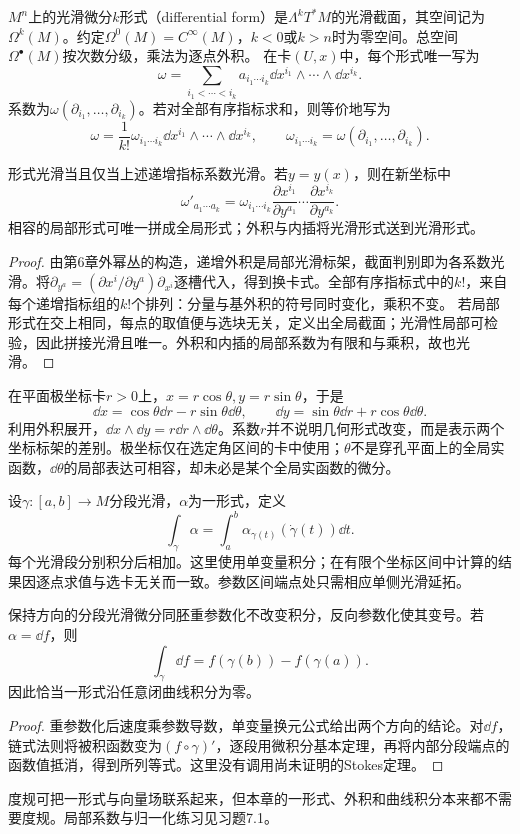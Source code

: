 \begin{definition}[微分形式与局部分量]
$M^n$上的光滑微分$k$形式（differential form）是$\Lambda^kT^*M$的光滑截面，其空间记为$\Omega^k(M)$。约定$\Omega^0(M)=C^\infty(M)$，$k<0$或$k>n$时为零空间。总空间$\Omega^\bullet(M)$按次数分级，乘法为逐点外积。
在卡$(U,x)$中，每个形式唯一写为
\[
 \omega=\sum_{i_1<\cdots<i_k}a_{i_1\cdots i_k}
 \dd x^{i_1}\wedge\cdots\wedge\dd x^{i_k}.
\]
系数为$\omega(\partial_{i_1},\ldots,\partial_{i_k})$。若对全部有序指标求和，则等价地写为
\[
 \omega=\frac1{k!}\omega_{i_1\cdots i_k}
 \dd x^{i_1}\wedge\cdots\wedge\dd x^{i_k},
 \qquad \omega_{i_1\cdots i_k}=\omega(\partial_{i_1},\ldots,\partial_{i_k}).
\]
\end{definition}
\begin{proposition}[形式的局部判别与换卡]\label{prop:forms-local}
形式光滑当且仅当上述递增指标系数光滑。若$y=y(x)$，则在新坐标中
\[
 \omega'_{a_1\cdots a_k}
 =\omega_{i_1\cdots i_k}
 \frac{\partial x^{i_1}}{\partial y^{a_1}}\cdots
 \frac{\partial x^{i_k}}{\partial y^{a_k}}.
\]
相容的局部形式可唯一拼成全局形式；外积与内插将光滑形式送到光滑形式。
\end{proposition}
\begin{proof}
由第6章外幂丛的构造，递增外积是局部光滑标架，截面判别即为各系数光滑。将$\partial_{y^a}=(\partial x^i/\partial y^a)\partial_{x^i}$逐槽代入，得到换卡式。全部有序指标式中的$k!$，来自每个递增指标组的$k!$个排列：分量与基外积的符号同时变化，乘积不变。
若局部形式在交上相同，每点的取值便与选块无关，定义出全局截面；光滑性局部可检验，因此拼接光滑且唯一。外积和内插的局部系数为有限和与乘积，故也光滑。
\end{proof}
\begin{example}[同一个面积形式的不同坐标]
在平面极坐标卡$r>0$上，$x=r\cos\theta,y=r\sin\theta$，于是
\[
 \dd x=\cos\theta\dd r-r\sin\theta\dd\theta,\qquad
 \dd y=\sin\theta\dd r+r\cos\theta\dd\theta.
\]
利用外积展开，$\dd x\wedge\dd y=r\dd r\wedge\dd\theta$。系数$r$并不说明几何形式改变，而是表示两个坐标标架的差别。极坐标仅在选定角区间的卡中使用；$\theta$不是穿孔平面上的全局实函数，$\dd\theta$的局部表达可相容，却未必是某个全局实函数的微分。
\end{example}
\begin{definition}[沿曲线的一形式积分]
设$\gamma:[a,b]\to M$分段光滑，$\alpha$为一形式，定义
\[
 \int_\gamma\alpha=\int_a^b\alpha_{\gamma(t)}(\dot\gamma(t))\dd t.
\]
每个光滑段分别积分后相加。这里使用单变量积分；在有限个坐标区间中计算的结果因逐点求值与选卡无关而一致。参数区间端点处只需相应单侧光滑延拓。
\end{definition}
\begin{proposition}[曲线积分与全微分]\label{prop:line-integral-exact}
保持方向的分段光滑微分同胚重参数化不改变积分，反向参数化使其变号。若$\alpha=\dd f$，则
\[
 \int_\gamma\dd f=f(\gamma(b))-f(\gamma(a)).
\]
因此恰当一形式沿任意闭曲线积分为零。
\end{proposition}
\begin{proof}
重参数化后速度乘参数导数，单变量换元公式给出两个方向的结论。对$\dd f$，链式法则将被积函数变为$(f\circ\gamma)'$，逐段用微积分基本定理，再将内部分段端点的函数值抵消，得到所列等式。这里没有调用尚未证明的Stokes定理。
\end{proof}
度规可把一形式与向量场联系起来，但本章的一形式、外积和曲线积分本来都不需要度规。局部系数与归一化练习见习题7.1。
